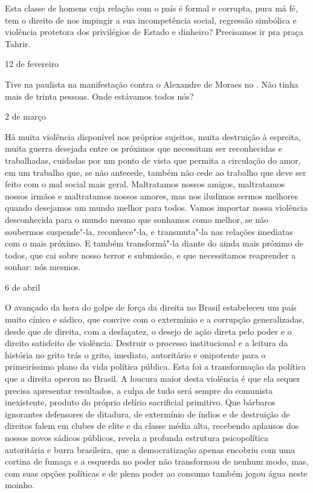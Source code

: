 Esta classe de homens cuja relação com o país é formal e corrupta, pura
má fé, tem o direito de nos impingir a sua incompetência social,
regressão simbólica e violência protetora dos privilégios de Estado e
dinheiro? Precisamos ir pra praça Tahrir.

\begin{flushright}
12 de fevereiro
\end{flushright}

Tive na paulista na manifestação contra o Alexandre de Moraes no .
Não tinha mais de trinta pessoas. Onde estávamos todos nós?

\begin{flushright}
2 de março
\end{flushright}

Há muita violência disponível nos próprios sujeitos, muita destruição à
espreita, muita guerra desejada entre os próximos que necessitam ser
reconhecidas e trabalhadas, cuidadas por um ponto de vista que permita a
circulação do amor, em um trabalho que, se não antecede, também não cede
ao trabalho que deve ser feito com o mal social mais geral. Maltratamos
nossos amigos, maltratamos nossos irmãos e maltratamos nossos amores,
mas nos iludimos sermos melhores quando desejamos um mundo melhor para
todos. Vamos importar nossa violência desconhecida para o mundo mesmo
que sonhamos como melhor, se não soubermos suspende"-la, reconhece"-la, e
transmuta"-la nas relações imediatas com o mais próximo. E também
transformá"-la diante do ainda mais próximo de todos, que cai sobre nosso
terror e submissão, e que necessitamos reaprender a sonhar: nós mesmos.

\begin{flushright}
6 de abril
\end{flushright}

O avançado da hora do golpe de força da direita no Brasil estabeleceu um
país muito cínico e sádico, que convive com o extermínio e a corrupção
generalizadas, desde que de direita, com a desfaçatez, o desejo de ação
direta pelo poder e o direito satisfeito de violência. Destruir o
processo institucional e a leitura da história no grito trás o grito,
imediato, autoritário e onipotente para o primeiríssimo plano da vida
política pública. Esta foi a transformação da política que a direita
operou no Brasil. A loucura maior desta violência é que ela sequer
precisa apresentar resultados, a culpa de tudo será sempre do comunista
inexistente, produto do próprio delírio sacrificial primitivo. Que
bárbaros ignorantes defensores de ditadura, de extermínio de índios e de
destruição de direitos falem em clubes de elite e da classe média alta,
recebendo aplausos dos nossos novos sádicos públicos, revela a profunda
estrutura psicopolítica autoritária e burra brasileira, que a
democratização apenas encobriu com uma cortina de fumaça e a esquerda no
poder não transformou de nenhum modo, mas, com suas opções políticas e
de pleno poder ao consumo também jogou água neste moinho.

